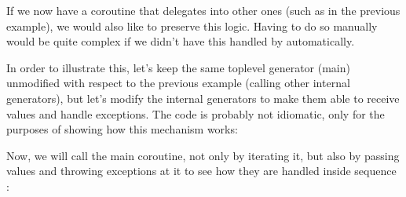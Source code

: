 \documentclass[a4paper,10pt,english]{sphinxmanual}
\begin{document}
If we now have a coroutine that delegates into other ones (such as in the previous example),
we would also like to preserve this logic. Having to do so manually would be quite
complex if we didn’t have this handled by  automatically.

In order to illustrate this, let’s keep the same top\sphinxhyphen{}level generator (main) unmodified with
respect to the previous example (calling other internal generators), but let’s modify the
internal generators to make them able to receive values and handle exceptions. The code is
probably not idiomatic, only for the purposes of showing how this mechanism works:

\begin{sphinxVerbatim}[commandchars=\\\{\}]
   
      
      

       
               
              
              

           
              
               

     
\end{sphinxVerbatim}

Now, we will call the main coroutine, not only by iterating it, but also by passing values
and throwing exceptions at it to see how they are handled inside sequence :
\end{document}
